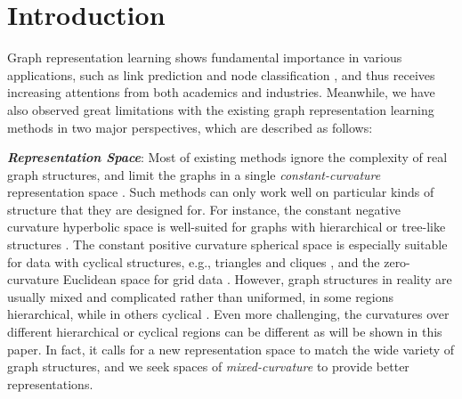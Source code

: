 
\section{Introduction}

Graph representation learning \cite{cui2018survey,hamilton2017inductive} shows fundamental importance in various applications, 
such as link prediction and node classification \cite{kipf2016semi}, 
and thus receives increasing attentions from both academics and industries.
Meanwhile, we have also observed great limitations with the existing graph representation learning methods in two major perspectives, 
which are described as follows:

\noindent \textbf{\emph{Representation Space}}:
Most of existing methods ignore the complexity of real graph structures, and limit the graphs in a single \emph{constant-curvature} representation space \cite{GuSGR19}.
Such methods can only work well on particular kinds of structure that they are designed for.
For instance, the constant negative curvature hyperbolic space is well-suited for graphs with hierarchical or tree-like structures \cite{HGNN}.
The constant positive curvature spherical space is especially suitable for data with cyclical structures, e.g., triangles and cliques \cite{BachmannBG20},
and the zero-curvature Euclidean space for grid data \cite{WuPCLZY21}.
However, graph structures in reality are usually mixed and complicated rather than uniformed, in some regions hierarchical, while in others cyclical \cite{papadopoulos2012popularity,ravasz2003hierarchical}.
Even more challenging, the curvatures over different hierarchical or cyclical regions can be different as will be shown in this paper.
In fact, it calls for a new representation space to match the wide variety of graph structures, and we seek spaces of \emph{mixed-curvature} to provide better representations.

